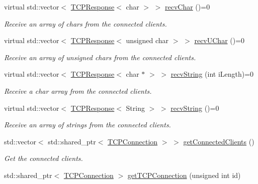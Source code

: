 \begin{DoxyCompactItemize}
virtual std\+::vector$<$ \hyperlink{class_rad_jav_1_1_networking_1_1_t_c_p_response}{T\+C\+P\+Response}$<$ char $>$ $>$ \hyperlink{class_rad_jav_1_1_networking_1_1_tcpip_server_acb87b668dc820b076f1468707568559f}{recv\+Char} ()=0
\begin{DoxyCompactList}\small\item\em Receive an array of chars from the connected clients. \end{DoxyCompactList}\item 
virtual std\+::vector$<$ \hyperlink{class_rad_jav_1_1_networking_1_1_t_c_p_response}{T\+C\+P\+Response}$<$ unsigned char $>$ $>$ \hyperlink{class_rad_jav_1_1_networking_1_1_tcpip_server_abce64108e962b56f49e8de7aa7a63c24}{recv\+U\+Char} ()=0
\begin{DoxyCompactList}\small\item\em Receive an array of unsigned chars from the connected clients. \end{DoxyCompactList}\item 
virtual std\+::vector$<$ \hyperlink{class_rad_jav_1_1_networking_1_1_t_c_p_response}{T\+C\+P\+Response}$<$ char $\ast$ $>$ $>$ \hyperlink{class_rad_jav_1_1_networking_1_1_tcpip_server_a9597cfbd00cbf0aa428602617dc2c623}{recv\+String} (int i\+Length)=0
\begin{DoxyCompactList}\small\item\em Receive a char array from the connected clients. \end{DoxyCompactList}\item 
virtual std\+::vector$<$ \hyperlink{class_rad_jav_1_1_networking_1_1_t_c_p_response}{T\+C\+P\+Response}$<$ String $>$ $>$ \hyperlink{class_rad_jav_1_1_networking_1_1_tcpip_server_af6d44fb732f6013e60c4ef120769b039}{recv\+String} ()=0
\begin{DoxyCompactList}\small\item\em Receive an array of strings from the connected clients. \end{DoxyCompactList}\item 
std\+::vector$<$ std\+::shared\+\_\+ptr$<$ \hyperlink{class_rad_jav_1_1_networking_1_1_t_c_p_connection}{T\+C\+P\+Connection} $>$ $>$ \hyperlink{class_rad_jav_1_1_networking_1_1_tcpip_server_a85ca14f6a78d996c971b4cd2f204052d}{get\+Connected\+Clients} ()
\begin{DoxyCompactList}\small\item\em Get the connected clients. \end{DoxyCompactList}\item 
std\+::shared\+\_\+ptr$<$ \hyperlink{class_rad_jav_1_1_networking_1_1_t_c_p_connection}{T\+C\+P\+Connection} $>$ \hyperlink{class_rad_jav_1_1_networking_1_1_tcpip_server_a9686643cbd42ac6ef517122a7d706602}{get\+T\+C\+P\+Connection} (unsigned int id)

\end{DoxyCompactItemize}
